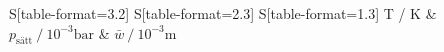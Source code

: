 \begin{table}
    \centering
    \caption{Bestimmung der Sättigungsdampfdrücke sowie der mittelen Weglängen.}
    \label{tab:0}
    \begin{tabular}{
	S[table-format=3.2]
	S[table-format=2.3]
	S[table-format=1.3]
	}
	\toprule
	{T  /  \si{\kelvin}}		& {$p_{\text{sätt}} \:/\: 10^{-3} \si{\bar}$}		& 
	{$\bar{w} \:/\: 10^{-3} \si{\metre} $}		\\ 
	\midrule
    
    \bottomrule
    \end{tabular}
    \end{table}
